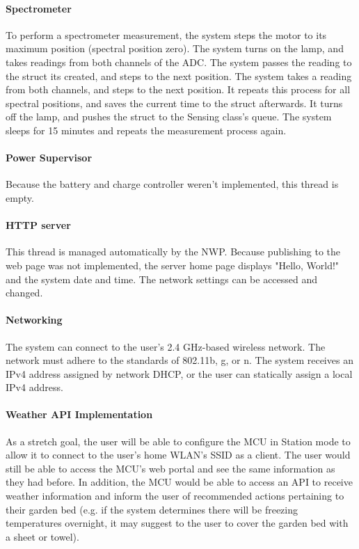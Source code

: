\paragraph{Spectrometer} To perform a spectrometer measurement, the system steps the motor to its maximum position (spectral position zero). The system turns on the lamp, and takes readings from both channels of the ADC. The system passes the reading to the struct its created, and steps to the next position. The system takes a reading from both channels, and steps to the next position. It repeats this process for all spectral positions, and saves the current time to the struct afterwards. It turns off the lamp, and pushes the struct to the Sensing class's queue. The system sleeps for 15 minutes and repeats the measurement process again.

\paragraph{Power Supervisor} Because the battery and charge controller weren't implemented, this thread is empty.

\paragraph{HTTP server} This thread is managed automatically by the NWP. Because publishing to the web page was not implemented, the server home page displays "Hello, World!" and the system date and time. The network settings can be accessed and changed.

\paragraph{Networking} The system can connect to the user's 2.4 GHz-based wireless network. The network must adhere to the standards of 802.11b, g, or n. The system receives an IPv4 address assigned by network DHCP, or the user can statically assign a local IPv4 address.

\paragraph{Weather API Implementation}
As a stretch goal, the user will be able to configure the MCU in Station mode to allow it to connect to the user's home WLAN's SSID as a client. The user would still be able to access the MCU's web portal and see the same information as they had before. In addition, the MCU would be able to access an API to receive weather information and inform the user of recommended actions pertaining to their garden bed (e.g. if the system determines there will be freezing temperatures overnight, it may suggest to the user to cover the garden bed with a sheet or towel).

